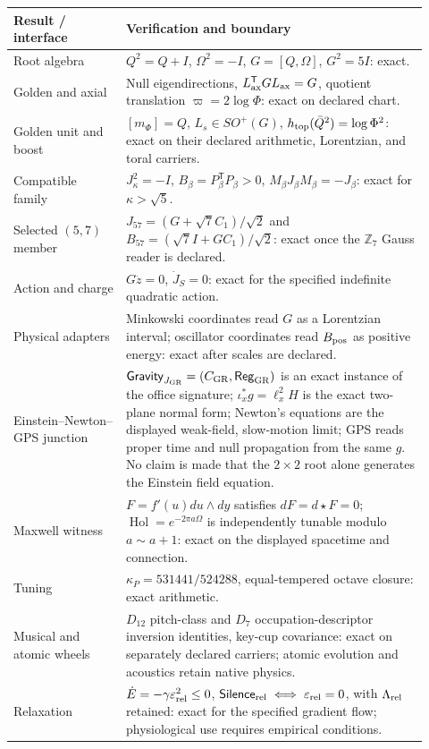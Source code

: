 \documentclass[10pt]{article}
\newcommand{\Z}{\mathbb Z}
\begin{document}
\small
\begin{longtable}{@{}p{0.25\linewidth}p{0.67\linewidth}@{}}\toprule
Result / interface & Verification and boundary\\ \midrule\endhead
Root algebra & $Q^2=Q+I$, $\Omega^2=-I$, $G=[Q,\Omega]$, $G^2=5I$: exact.\\
Golden and axial & Null eigendirections, $L_{\rm ax}^{\mathsf T}GL_{\rm ax}=G$, quotient translation $\varpi=2\log\Phi$: exact on declared chart.\\
Golden unit and boost & $[m_\Phi]=Q$, $L_s\in SO^+(G)$, $h_{\rm top}(\bar Q^2)=\log\Phi^2$: exact on their declared arithmetic, Lorentzian, and toral carriers.\\
Compatible family & $J_\kappa^2=-I$, $B_\beta=P_\beta^{\mathsf T}P_\beta>0$, $M_\beta J_\beta M_\beta=-J_\beta$: exact for $\kappa>\sqrt5$.\\
Selected $(5,7)$ member & $J_{57}=(G+\sqrt7C_1)/\sqrt2$ and $B_{57}=(\sqrt7I+GC_1)/\sqrt2$: exact once the $\Z_7$ Gauss reader is declared.\\
Action and charge & $G\ddot z=0$, $\dot J_S=0$: exact for the specified indefinite quadratic action.\\
Physical adapters & Minkowski coordinates read $G$ as a Lorentzian interval; oscillator coordinates read $B_{\rm pos}$ as positive energy: exact after scales are declared.\\
Einstein--Newton--GPS junction & $\mathsf{Gravity}_{J_{\rm GR}}=(C_{\rm GR},\mathsf{Reg}_{\rm GR})$ is an exact instance of the office signature; $\iota_x^*g=\ell_x^2H$ is the exact two-plane normal form; Newton's equations are the displayed weak-field, slow-motion limit; GPS reads proper time and null propagation from the same $g$. No claim is made that the $2\times2$ root alone generates the Einstein field equation.\\
Maxwell witness & $F=f'(u)du\wedge dy$ satisfies $dF=d\star F=0$; $\operatorname{Hol}=e^{-2\pi a\Omega}$ is independently tunable modulo $a\sim a+1$: exact on the displayed spacetime and connection.\\
Tuning & $\kappa_P=531441/524288$, equal-tempered octave closure: exact arithmetic.\\
Musical and atomic wheels & $D_{12}$ pitch-class and $D_7$ occupation-descriptor inversion identities, key-cup covariance: exact on separately declared carriers; atomic evolution and acoustics retain native physics.\\ 
Relaxation & $\dot E=-\gamma\varepsilon_{\rm rel}^2\le0$, $\mathsf{Silence}_{\rm rel}\iff\varepsilon_{\rm rel}=0$, with $\Lambda_{\rm rel}$ retained: exact for the specified gradient flow; physiological use requires empirical conditions.\\

\end{longtable}
\end{document}
